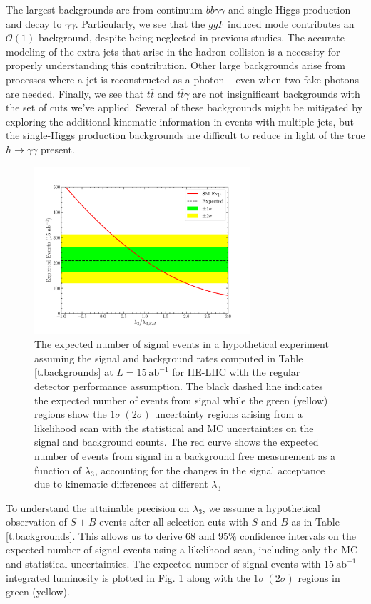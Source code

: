 The largest backgrounds are from continuum $bb\gamma\gamma$ and single Higgs production and decay to $\gamma\gamma$. Particularly, we see that the $ggF$ induced mode contributes an $\mathcal{O}(1)$ background, despite being neglected in previous studies. The accurate modeling of the extra jets that arise in the hadron collision is a necessity for properly understanding this contribution.
Other large backgrounds arise from processes where a jet is reconstructed as a photon -- even when two fake photons are needed. Finally, we see that $t\bar{t}$ and $t\bar{t}\gamma$ are not insignificant backgrounds with the set of cuts we've applied. Several of these backgrounds might be mitigated by exploring the additional kinematic information in events with multiple jets, but the single-Higgs production backgrounds are difficult to reduce in light of the true $h\rightarrow \gamma\gamma$ present.

\begin{figure}
	\centering
	\includegraphics[width=8cm]{section3/plots/lam3_limits_ylo}
	\caption{The expected number of signal events in a hypothetical experiment assuming the signal and background rates computed in Table \ref{t.backgrounds} at $L = 15~\text{ab}^{-1}$ for HE-LHC with the regular detector performance assumption. The black dashed line indicates the expected number of events from signal while the green (yellow) regions show the $1\sigma~(2\sigma)$ uncertainty regions arising from a likelihood scan with the statistical and MC uncertainties on the signal and background counts. The red curve shows the expected number of events from signal in a background free measurement as a function of $\lambda_3$, accounting for the changes in the signal acceptance due to kinematic differences at different $\lambda_3$}\label{fig:lam3_limit}
\end{figure}

To understand the attainable precision on $\lambda_{3}$, we assume a hypothetical observation of $S+B$ events after all selection cuts with $S$ and $B$ as in Table \ref{t.backgrounds}. This allows us to derive $68$ and $95\%$ confidence intervals on the expected number of signal events using a likelihood scan, including only the MC and statistical uncertainties. The expected number of signal events with $15~\text{ab}^{-1}$ integrated luminosity is plotted in Fig. \ref{fig:lam3_limit} along with the $1\sigma~(2\sigma)$ regions in green (yellow).

